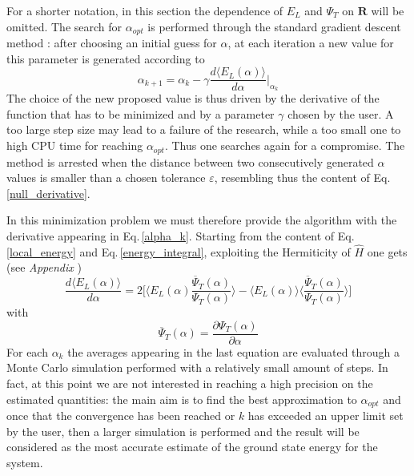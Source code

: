 For a shorter notation, in this section the dependence of $E_L$ and $\Psi_T$ on $\bm{R}$ will be omitted. The search for $\alpha_{opt}$ is performed through the standard gradient descent method \cite{painless}: after choosing an initial guess for $\alpha$, at each iteration a new value for this parameter is generated according to
\begin{equation}
    \alpha_{k+1} = \alpha_{k} - \gamma \frac{d \langle E_L(\alpha) \rangle}{d\alpha} \bigg\vert_{\alpha_k}
    \label{alpha_k}
\end{equation}
The choice of the new proposed value is thus driven by the derivative of the function that has to be minimized and by a parameter $\gamma$ chosen by the user. A too large step size may lead to a failure of the research, while a too small one to high CPU time for reaching $\alpha_{opt}$. Thus one searches again for a compromise. The method is arrested when the distance between two consecutively generated $\alpha$ values is smaller than a chosen tolerance $\varepsilon$, resembling thus the content of Eq.\,\ref{null_derivative}. 

In this minimization problem we must therefore provide the algorithm with the derivative appearing in Eq.\,\ref{alpha_k}. Starting from the content of Eq.\,\ref{local_energy} and Eq.\,\ref{energy_integral}, exploiting the Hermiticity of $\hat{H}$ one gets (see \textit{Appendix} )
\begin{equation*}
    \frac{d\langle E_L(\alpha) \rangle}{d\alpha} = 2 \bigg[ \bigg\langle E_L(\alpha) \frac{\overline{\Psi}_T(\alpha)}{\Psi_T(\alpha)} \bigg\rangle - \langle E_L(\alpha) \rangle \bigg\langle \frac{\overline{\Psi}_T(\alpha)}{\Psi_T(\alpha)}\bigg\rangle \bigg]
\end{equation*}
with 
\begin{equation*}
    \overline{\Psi}_T(\alpha) = \frac{\partial  \Psi_T(\alpha)}{\partial \alpha}
\end{equation*}
For each $\alpha_k$ the averages appearing in the last equation are evaluated through a Monte Carlo simulation performed with a relatively small amount of steps. In fact, at this point we are not interested in reaching a high precision on the estimated quantities: the main aim is to find the best approximation to $\alpha_{opt}$ and once that the convergence has been reached or $k$ has exceeded an upper limit set by the user, then a larger simulation is performed and the result will be considered as the most accurate estimate of the ground state energy for the system. 

